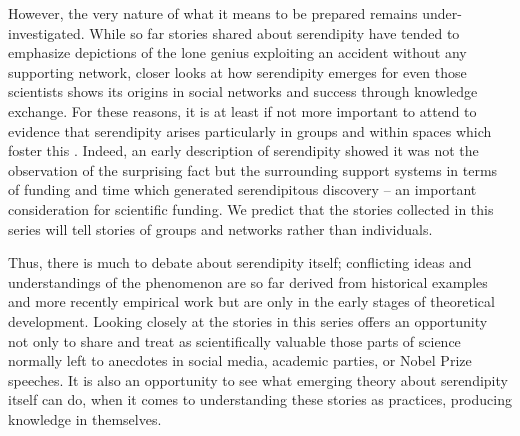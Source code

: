 \documentclass[authordate, empirical]{jote-new-article}
\begin{document}
However, the very nature of what it means to be prepared remains under-investigated. While so far stories shared about serendipity have tended to emphasize depictions of the lone genius exploiting an accident without any supporting network, closer looks at how serendipity emerges for even those scientists shows its origins in social networks and success through knowledge exchange. For these reasons, it is at least if not more important to attend to evidence that serendipity arises particularly in groups and within spaces which foster this \parencites{Darbellay2014}{McCulloch2021}. Indeed, an early description of serendipity \parencites{Barber1958} showed it was not the observation of the surprising fact but the surrounding support systems in terms of funding and time which generated serendipitous discovery -- an important consideration for scientific funding. We predict that the stories collected in this series will tell stories of groups and networks rather than individuals.



Thus, there is much to debate about serendipity itself; conflicting ideas and understandings of the phenomenon are so far derived from historical examples and more recently empirical work but are only in the early stages of theoretical development. Looking closely at the stories in this series offers an opportunity not only to share and treat as scientifically valuable those parts of science normally left to anecdotes in social media, academic parties, or Nobel Prize speeches. It is also an opportunity to see what emerging theory about serendipity itself can do, when it comes to understanding these stories as practices, producing knowledge in themselves.





\printbibliography
\end{document}
